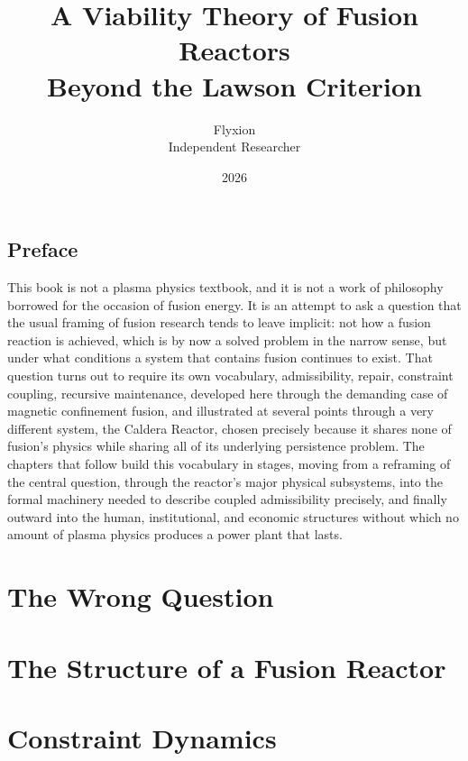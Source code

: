 \documentclass[11pt]{book}
\title{\Huge A Viability Theory of Fusion Reactors \\[0.3em] \large Beyond the Lawson Criterion}
\author{Flyxion \\ \small Independent Researcher}
\date{2026}
\begin{document}
\frontmatter

\maketitle

\tableofcontents

\chapter*{Preface}

This book is not a plasma physics textbook, and it is not a work of philosophy borrowed for the occasion of fusion energy. It is an attempt to ask a question that the usual framing of fusion research tends to leave implicit: not how a fusion reaction is achieved, which is by now a solved problem in the narrow sense, but under what conditions a system that contains fusion continues to exist. That question turns out to require its own vocabulary, admissibility, repair, constraint coupling, recursive maintenance, developed here through the demanding case of magnetic confinement fusion, and illustrated at several points through a very different system, the Caldera Reactor, chosen precisely because it shares none of fusion's physics while sharing all of its underlying persistence problem. The chapters that follow build this vocabulary in stages, moving from a reframing of the central question, through the reactor's major physical subsystems, into the formal machinery needed to describe coupled admissibility precisely, and finally outward into the human, institutional, and economic structures without which no amount of plasma physics produces a power plant that lasts.

\mainmatter

\part{The Wrong Question}




\part{The Structure of a Fusion Reactor}




\part{Constraint Dynamics}



\end{document}
